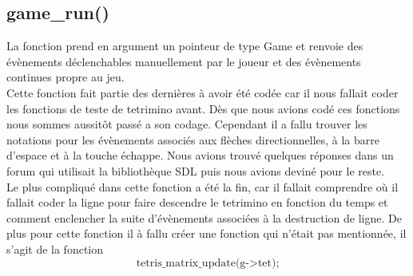 \documentclass[a4paper,10p]{report}
\begin{document}
\subsection{game\_run()}
\label{game_run}
La fonction prend en argument un pointeur de type Game et renvoie des évènements déclenchables manuellement par le joueur et des évènements continues propre au jeu. 
\\Cette fonction fait partie des dernières à avoir été codée car il nous fallait coder les fonctions de teste de tetrimino avant. Dès que nous avions codé ces fonctions nous sommes aussitôt passé a son codage. Cependant il a fallu trouver les notations pour les évènements associés aux flèches directionnelles, à la barre d'espace et à la touche échappe. Nous avions trouvé quelques réponses dans un forum qui utilisait la bibliothèque SDL puis nous avions deviné pour le reste. 
\\ Le plus compliqué dans cette fonction a été la fin, car il fallait comprendre où il fallait coder la ligne pour faire descendre le tetrimino en fonction du temps et comment enclencher la suite d'évènements associées à la destruction de ligne. De plus pour cette fonction il à fallu créer une fonction qui n'était pas mentionnée, il s'agit de la fonction
\begin{equation*}
\text{tetris\_matrix\_update(g->tet);}
\end{equation*}
\end{document}
